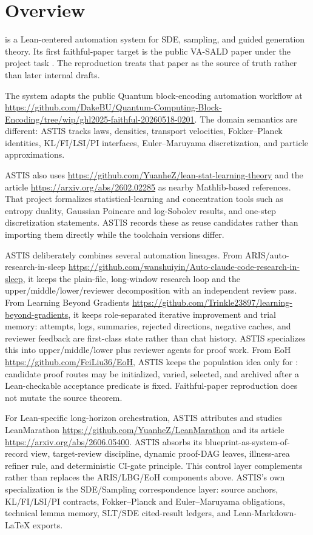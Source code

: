 \section{Overview}

\ASTIS{} is a Lean-centered automation system for SDE, sampling, and guided
generation theory.  Its first faithful-paper target is the public VA-SALD
paper under the project task .  The reproduction treats
that paper as the source of truth rather than later internal drafts.

The system adapts the public Quantum block-encoding automation workflow at
\url{https://github.com/DakeBU/Quantum-Computing-Block-Encoding/tree/wip/ghl2025-faithful-20260518-0201}.  The domain semantics are different: ASTIS tracks laws,
densities, transport velocities, Fokker--Planck identities, KL/FI/LSI/PI
interfaces, Euler--Maruyama discretization, and particle approximations.

ASTIS also uses \url{https://github.com/YuanheZ/lean-stat-learning-theory} and the article
\url{https://arxiv.org/abs/2602.02285} as nearby Mathlib-based references.  That project
formalizes statistical-learning and concentration tools such as entropy
duality, Gaussian Poincare and log-Sobolev results, and one-step
discretization statements.  ASTIS records these as reuse candidates rather
than importing them directly while the toolchain versions differ.

ASTIS deliberately combines several automation lineages.  From
ARIS/auto-research-in-sleep \url{https://github.com/wanshuiyin/Auto-claude-code-research-in-sleep}, it keeps the plain-file,
long-window research loop and the upper/middle/lower/reviewer decomposition
with an independent review pass.  From Learning Beyond Gradients
\url{https://github.com/Trinkle23897/learning-beyond-gradients}, it keeps role-separated iterative improvement and trial
memory: attempts, logs, summaries, rejected directions, negative caches, and
reviewer feedback are first-class state rather than chat history.  ASTIS
specializes this into upper/middle/lower plus reviewer agents for proof work.
From EoH \url{https://github.com/FeiLiu36/EoH}, ASTIS keeps the population idea only for
: candidate proof routes may be initialized, varied,
selected, and archived after a Lean-checkable acceptance predicate is fixed.
Faithful-paper reproduction does not mutate the source theorem.

For Lean-specific long-horizon orchestration, ASTIS attributes and studies
LeanMarathon \url{https://github.com/YuanheZ/LeanMarathon} and its article
\url{https://arxiv.org/abs/2606.05400}.  ASTIS absorbs its blueprint-as-system-of-record
view, target-review discipline, dynamic proof-DAG leaves, illness-area
refiner rule, and deterministic CI-gate principle.  This control layer
complements rather than replaces the ARIS/LBG/EoH components above.  ASTIS's
own specialization is the SDE/Sampling correspondence layer: source anchors,
KL/FI/LSI/PI contracts, Fokker--Planck and Euler--Maruyama obligations,
technical lemma memory, SLT/SDE cited-result ledgers, and
Lean-Markdown-LaTeX exports.

